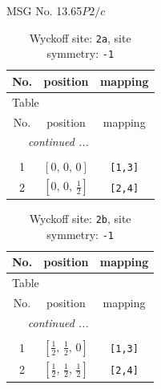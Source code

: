 \documentclass[fleqn,8pt]{jsarticle}
\begin{document}
\setcounter{MaxMatrixCols}{32}

\renewcommand{\tablename}{Table~}
\renewcommand{\figurename}{Figure~}
\begin{center}
\LARGE
MSG No. 13.65\quad$P2/c$
\end{center}
\renewcommand{\arraystretch}{1.2}
\begin{longtable}{ccc}
\caption{Wyckoff site: {\tt 2a}, site symmetry: {\tt -1}}
 \\
 \hline \hline
No. & position & mapping \\ \hline \endfirsthead

\multicolumn{2}{l}{\tablename\ \thetable{}} \\
 \hline \hline
No. & position & mapping \\ \hline \endhead

 \hline \hline
\multicolumn{2}{r}{\footnotesize\it continued ...} \\ \endfoot

 \hline \hline
\multicolumn{2}{r}{} \\ \endlastfoot

1 & $\left[ 0,\, 0,\, 0 \right]$ & {\tt [1,3]} \\ \hline
2 & $\left[ 0,\, 0,\, \frac{1}{2} \right]$ & {\tt [2,4]} \\
\end{longtable}
\renewcommand{\arraystretch}{1.2}
\begin{longtable}{ccc}
\caption{Wyckoff site: {\tt 2b}, site symmetry: {\tt -1}}
 \\
 \hline \hline
No. & position & mapping \\ \hline \endfirsthead

\multicolumn{2}{l}{\tablename\ \thetable{}} \\
 \hline \hline
No. & position & mapping \\ \hline \endhead

 \hline \hline
\multicolumn{2}{r}{\footnotesize\it continued ...} \\ \endfoot

 \hline \hline
\multicolumn{2}{r}{} \\ \endlastfoot

1 & $\left[ \frac{1}{2},\, \frac{1}{2},\, 0 \right]$ & {\tt [1,3]} \\ \hline
2 & $\left[ \frac{1}{2},\, \frac{1}{2},\, \frac{1}{2} \right]$ & {\tt [2,4]} \\
\end{longtable}
\renewcommand{\arraystretch}{1.2}
\end{document}
